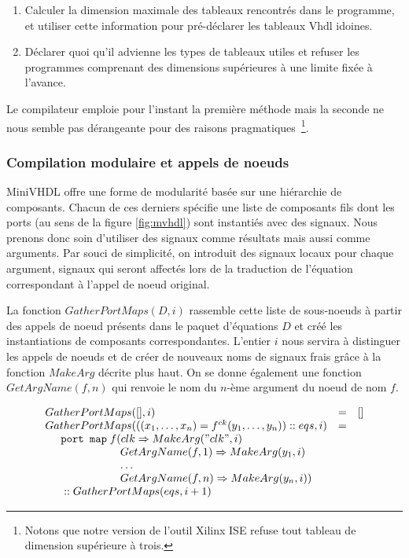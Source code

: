 \documentclass[a4paper]{article}
\newcommand{\minivhdl}{{\sc MiniVHDL}}
\newcommand{\vhdl}{{\sc Vhdl}}
\newcommand{\mybox}[1]{\mbox{\tt{#1}}}
\newcommand{\ind}[0]{\hspace{0.5cm}}
\newcommand{\Cons}[0]{\; \mathbf{::} \;}
\newcommand{\App}[2]{#1^{ck}(#2)}
\begin{document}
\begin{enumerate}
\item Calculer la dimension maximale des tableaux rencontr\'es dans le
  programme, et utiliser cette information pour pr\'e-d\'eclarer les
  tableaux \vhdl{} idoines.
\item D\'eclarer quoi qu'il advienne les types de tableaux utiles et
  refuser les programmes comprenant des dimensions sup\'erieures \`a une
  limite fix\'ee \`a l'avance.
\end{enumerate}

Le compilateur emploie pour l'instant la premi\`ere m\'ethode mais la seconde ne
nous semble pas d\'erangeante pour des raisons pragmatiques~\footnote{Notons que
  notre version de l'outil Xilinx ISE refuse tout tableau de
  dimension sup\'erieure \`a trois.}.

\subsubsection{Compilation modulaire et appels de noeuds}

\minivhdl{} offre une forme de modularit\'e bas\'ee sur une hi\'erarchie de
composants. Chacun de ces derniers sp\'ecifie une liste de composants fils dont
les ports (au sens de la figure \ref{fig:mvhdl}) sont instanti\'es avec des
signaux. Nous prenons donc soin d'utiliser des signaux comme r\'esultats mais
aussi comme arguments. Par souci de simplicit\'e, on introduit des signaux locaux
pour chaque argument, signaux qui seront affect\'es lors de la traduction de
l'\'equation correspondant \`a l'appel de noeud original.

La fonction $GatherPortMaps(D, i)$ rassemble cette liste de sous-noeuds \`a
partir des appels de noeud pr\'esents dans le paquet d'\'equations $D$ et
cr\'e\'e les instantiations de composants correspondantes. L'entier $i$ nous
servira \`a distinguer les appels de noeuds et de cr\'eer de nouveaux noms de
signaux frais gr\^ace \`a la fonction $MakeArg$ d\'ecrite plus haut. On se donne
\'egalement une fonction $GetArgName(f,n)$ qui renvoie le nom du $n$-\`eme
argument du noeud de nom $f$.

\newcommand{\GPM}[2]{GatherPortMaps(#1,#2)}
\newcommand{\GAN}[2]{GetArgName(#1,#2)}

\[
\begin{array}{lcl}
  \GPM{[]}{i} & = & [] \\
  \GPM{((x_1,\dots,x_n) = \App{f}{y_1,\dots,y_n}) \Cons eqs}{i} & = &
  \\
  \ind \mybox{port map} \; f ( clk \Rightarrow \MA{"clk"}{i} \\
  \ind \ind \ind \ind \hspace{0.4cm} \GAN{f}{1} \Rightarrow \MA{y_1}{i} \\
  \ind \ind \ind \ind \hspace{0.4cm} \dots \\
  \ind \ind \ind \ind \hspace{0.4cm} \GAN{f}{n} \Rightarrow \MA{y_n}{i}) \\
  \ind \Cons \GPM{eqs}{i + 1}
\end{array}
\]
\end{document}
